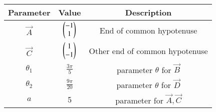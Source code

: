 
\begin{tabular}[]{|c|c|c|}
\hline
Parameter	& Value	& Description \\ \hline
$\vec{A}$	& $\begin{pmatrix}-1\\1\end{pmatrix}$ & End of common hypotenuse \\ \hline
$\vec{C}$	& $\begin{pmatrix}1\\-1\end{pmatrix}$ & Other end of common hypotenuse\\[1pt] \hline
$\theta_1$		& $ \frac{3\pi}{5} $ & parameter $\theta$ for $\vec{B}$ \\[1pt] \hline
$\theta_2$ 		& $ \frac{9 \pi}{20}$ & parameter $\theta$ for $\vec{D}$\\ \hline
$a$	& 5 	& parameter for $\vec{A},\vec{C}$ \\ \hline
\end{tabular}
